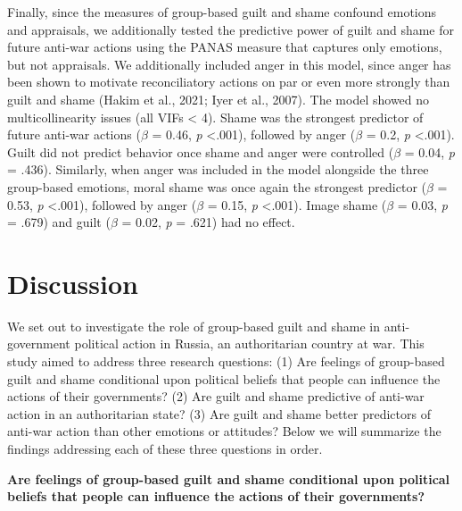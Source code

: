 \documentclass[
]{article}
\begin{document}
Finally, since the measures of group-based guilt and shame confound emotions and appraisals, we additionally tested the predictive power of guilt and shame for future anti-war actions using the PANAS measure that captures only emotions, but not appraisals. We additionally included anger in this model, since anger has been shown to motivate reconciliatory actions on par or even more strongly than guilt and shame (Hakim et al., 2021; Iyer et al., 2007). The model showed no multicollinearity issues (all VIFs \textless{} 4). Shame was the strongest predictor of future anti-war actions (\(\beta\) = 0.46, \emph{p} \textless.001), followed by anger (\(\beta\) = 0.2, \emph{p} \textless.001). Guilt did not predict behavior once shame and anger were controlled (\(\beta\) = 0.04, \emph{p} = .436). Similarly, when anger was included in the model alongside the three group-based emotions, moral shame was once again the strongest predictor (\(\beta\) = 0.53, \emph{p} \textless.001), followed by anger (\(\beta\) = 0.15, \emph{p} \textless.001). Image shame (\(\beta\) = 0.03, \emph{p} = .679) and guilt (\(\beta\) = 0.02, \emph{p} = .621) had no effect.

\allsectionsfont{\centering}

\section*{Discussion}\label{discussion}

We set out to investigate the role of group-based guilt and shame in anti-government political action in Russia, an authoritarian country at war. This study aimed to address three research questions: (1) Are feelings of group-based guilt and shame conditional upon political beliefs that people can influence the actions of their governments? (2) Are guilt and shame predictive of anti-war action in an authoritarian state? (3) Are guilt and shame better predictors of anti-war action than other emotions or attitudes? Below we will summarize the findings addressing each of these three questions in order.

\textbf{Are feelings of group-based guilt and shame conditional upon political beliefs that people can influence the actions of their governments?}
\end{document}
